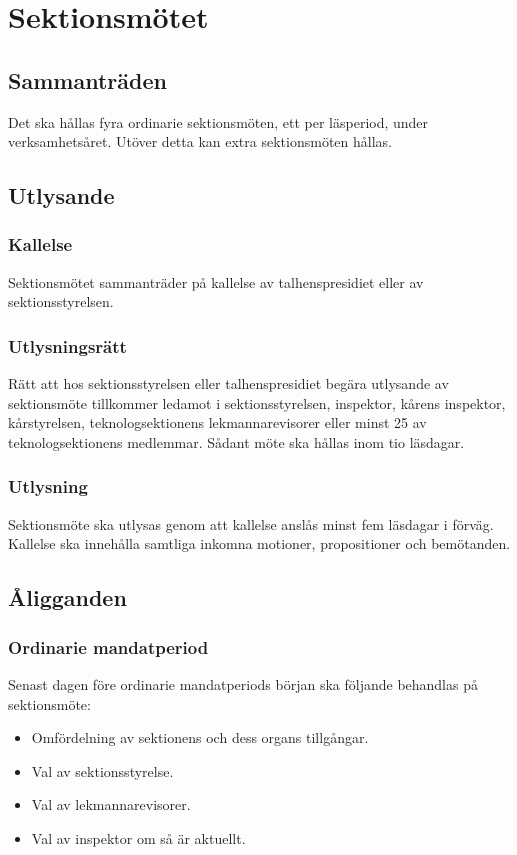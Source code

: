 \section{Sektionsmötet}
\subsection{Sammanträden}
Det ska hållas fyra ordinarie sektionsmöten, ett per läsperiod, under verksamhetsåret. Utöver detta kan extra sektionsmöten hållas.
\subsection{Utlysande}
\subsubsection{Kallelse}
Sektionsmötet sammanträder på kallelse av talhenspresidiet eller av sektionsstyrelsen.
\subsubsection{Utlysningsrätt}
Rätt att hos sektionsstyrelsen eller talhenspresidiet begära utlysande av sektionsmöte tillkommer ledamot i sektionsstyrelsen, inspektor, kårens inspektor, kårstyrelsen, teknologsektionens lekmannarevisorer eller minst 25 av teknologsektionens medlemmar. Sådant möte ska hållas inom tio läsdagar.
\subsubsection{Utlysning}
\label{sec:sektionsmote_utlysande}
Sektionsmöte ska utlysas genom att kallelse anslås minst fem läsdagar i förväg.
Kallelse ska innehålla samtliga inkomna motioner, propositioner och bemötanden.
\subsection{Åligganden}
\subsubsection{Ordinarie mandatperiod}
Senast dagen före ordinarie mandatperiods början ska följande behandlas på sektionsmöte:
\begin{itemize}
\item Omfördelning av sektionens och dess organs tillgångar.
\item Val av sektionsstyrelse.
\item Val av lekmannarevisorer.
\item Val av inspektor om så är aktuellt.
\end{itemize}
